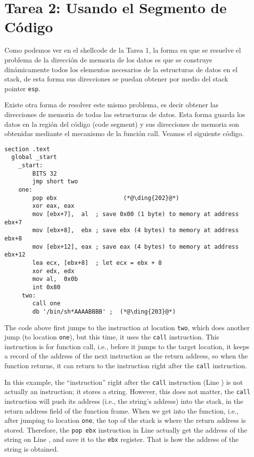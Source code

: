 \section{Tarea 2: Usando el Segmento de Código}

Como podemos ver en el shellcode de la Tarea 1, la forma en que se resuelve el problema de la dirección de memoria de los datos es que se construye dinámicamente todos los elementos necesarios de la estructuras de datos en el stack, de esta forma sus direcciones se puedan obtener por medio del stack pointer \texttt{esp}.

Existe otra forma de resolver este mismo problema, es decir obtener las direcciones de memoria de todas las estructuras de datos. Esta forma guarda los datos en la región del código (code segment) y sus direcciones de memoria son obtenidas mediante el mecanismo de la función call. Veamos el siguiente código.


\begin{lstlisting}[caption={\texttt{mysh2.s}}]
section .text
  global _start
    _start:
        BITS 32
        jmp short two
    one:
        pop ebx                   (*@\ding{202}@*)
        xor eax, eax
        mov [ebx+7],  al  ; save 0x00 (1 byte) to memory at address ebx+7
        mov [ebx+8],  ebx ; save ebx (4 bytes) to memory at address ebx+8
        mov [ebx+12], eax ; save eax (4 bytes) to memory at address ebx+12
        lea ecx, [ebx+8]  ; let ecx = ebx + 8
        xor edx, edx
        mov al,  0x0b
        int 0x80
     two:
        call one
        db '/bin/sh*AAAABBBB' ;  (*@\ding{203}@*)
\end{lstlisting}

The code above first jumps to the instruction at 
location \texttt{two}, which does another 
jump (to location \texttt{one}), but this time,
it uses the \texttt{call} instruction.  This instruction 
is for function call, i.e., before it jumps to
the target location, it keeps a record of the address
of the next instruction as the return address, so when
the function returns, it can return to the 
instruction right after the \texttt{call} instruction.  

In this example, the ``instruction'' right after the 
\texttt{call} instruction (Line ) is not actually an instruction; 
it stores a string. However, this does not matter, the
\texttt{call} instruction will push its address (i.e.,
the string's address) into the stack, in the return
address field of the function frame. When we 
get into the function, i.e., after jumping to 
location \texttt{one}, the top of the stack 
is where the return address is stored. Therefore,
the \texttt{pop ebx} instruction in Line  actually
get the address of the string on Line , 
and save it to the \texttt{ebx} register. That is how the 
address of the string is obtained. 


